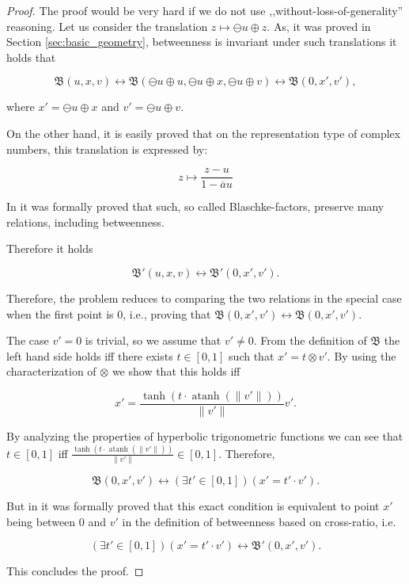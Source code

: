 \documentclass[a4paper]{article}
\DeclareMathOperator{\atanh}{atanh}
\theoremstyle{definition}
\begin{document}
\begin{proof}
  The proof would be very hard if we do not use
  ,,without-loss-of-generality'' reasoning. Let us consider the
  translation $z \mapsto \ominus u \oplus z$. As, it was proved in
  Section \ref{sec:basic_geometry}, betweenness is invariant under
  such translations it holds that

  $$\mathfrak{B}(u, x, v) \longleftrightarrow \mathfrak{B}(\ominus u\oplus u, \ominus u \oplus x, \ominus u\oplus v) \longleftrightarrow \mathfrak{B}(0, x', v'),$$

  \noindent where $x' = \ominus u \oplus x$ and
  $v' = \ominus u \oplus v$.
  
  On the other hand, it is easily proved that on the representation
  type of complex numbers, this translation is expressed by:

  $$z \mapsto \frac{z - u}{1 - \overline{a}u}$$

  In \cite{amai-poincare} it was formally proved that such, so called
  Blaschke-factors, preserve many relations, including betweenness.
  
  Therefore it holds

  $$\mathfrak{B}'(u, x, v) \longleftrightarrow \mathfrak{B}'(0, x', v').$$

  Therefore, the problem reduces to comparing the two relations in the
  special case when the first point is 0, i.e., proving that
  $\mathfrak{B}(0, x', v') \longleftrightarrow \mathfrak{B}(0, x',
  v')$.

  The case $v'=0$ is trivial, so we assume that $v' \neq 0$. From the
  definition of $\mathfrak{B}$ the left hand side holds iff there
  exists $t \in [0, 1]$ such that $x' = t \otimes v'$. By using the
  characterization of $\otimes$ we show that this holds iff

  $$x' = \frac{\tanh(t \cdot \atanh (\lVert v'\rVert))}{\lVert
    v'\rVert}v'.$$

  By analyzing the properties of hyperbolic trigonometric functions we
  can see that $t \in [0, 1]$ iff
  $\frac{\tanh(t \cdot \atanh (\lVert v'\rVert))}{\lVert v'\rVert} \in
  [0, 1]$. Therefore,

  $$\mathfrak{B}(0, x', v') \longleftrightarrow (\exists t' \in [0, 1])(x' = t' \cdot v').$$

  But in \cite{amai-poincare} it was formally proved that this exact
  condition is equivalent to point $x'$ being between $0$ and $v'$ in
  the definition of betweenness based on cross-ratio, i.e.

  $$(\exists t' \in [0, 1])(x' = t' \cdot v') \longleftrightarrow \mathfrak{B}'(0, x', v').$$

  This concludes the proof.
\end{proof}
\end{document}
